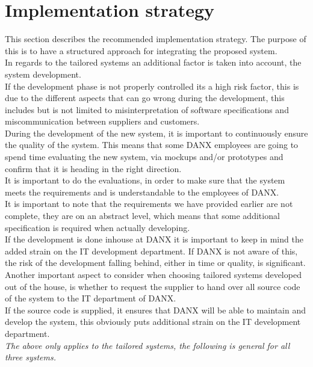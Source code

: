 \section{Implementation strategy}
\label{sec:implementation_strategy}
This section describes the recommended implementation strategy. The purpose of this is to have a structured approach for integrating the proposed system.\\
In regards to the tailored systems an additional factor is taken into account, the system development.\\
If the development phase is not properly controlled its a high risk factor, this is due to the different aspects that can go wrong during the development, this includes but is not limited to misinterpretation of software specifications and miscommunication between suppliers and customers.\\
During the development of the new system, it is important to continuously ensure the quality of the system. This means that some DANX employees are going to spend time evaluating the new system, via mockups and/or prototypes and confirm that it is heading in the right direction. \\
It is important to do the evaluations, in order to make sure that the system meets the requirements and is understandable to the employees of DANX.\\
It is important to note that the requirements we have provided earlier are not complete, they are on an abstract level, which means that some additional specification is required when actually developing.\\
If the development is done inhouse at DANX it is important to keep in mind the added strain on the IT development department. If DANX is not aware of this, the risk of the development falling behind, either in time or quality, is significant. \\
Another important aspect to consider when choosing tailored systems developed out of the house, is whether to request the supplier to hand over all source code of the system to the IT department of DANX.\\
If the source code is supplied, it ensures that DANX will be able to maintain and develop the system, this obviously puts additional strain on the IT development department.\\

\textit{The above only applies to the tailored systems, the following is general for all three systems.}

